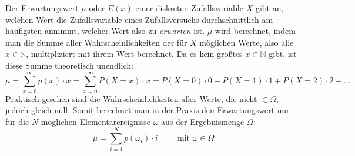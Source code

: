 \begin{figure}[h!]
	\centering
\end{figure}


Der Erwartungswert $\mu$ oder $E(x)$ einer diskreten Zufallsvariable $X$ gibt an, welchen Wert die Zufallsvariable eines Zufallsversuchs durchschnittlich am h\"{a}ufigsten annimmt, welcher Wert also zu \emph{erwarten} ist. $\mu$ wird berechnet, indem man die Summe aller Wahrscheinlichkeiten der f\"{u}r $X$ m\"{o}glichen Werte, also alle $x \in \mathbb{N}$, multipliziert mit ihrem Wert berechnet. Da es kein gr\"{o}\ss{}tes $x \in \mathbb{N}$ gibt, ist diese Summe theoretisch unendlich: $$\mu = \sum_{x=0}^{\infty} p(x) \cdot x = \sum_{x=0}^{\infty} P(X = x) \cdot x = P(X = 0) \cdot 0 + P(X = 1) \cdot 1 + P(X = 2) \cdot 2 + \dots$$ Praktisch gesehen sind die Wahrscheinlichkeiten aller Werte, die nicht $\in \Omega$, jedoch gleich null. Somit berechnet man in der Praxis den Erwartungswert nur f\"{u}r die $N$ m\"{o}glichen Elementarereignisse $\omega$ aus der Ergebnismenge $\Omega$: $$\mu = \sum_{i=1}^{N} p(\omega_i) \cdot i \hspace{1cm} \text{mit } \omega \in \Omega$$


